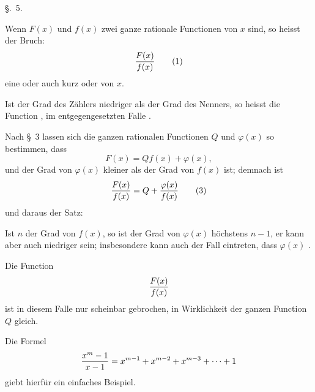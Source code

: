 
\begin{center}
{\large \S.\ 5.}

\vspace{0.5em}
{\large{}}
\end{center}

Wenn $F(x)$ und $f(x)$ zwei ganze rationale Functionen von $x$ sind,
so heisst der Bruch:
\begin{equation}
 {F(x)\over f(x)}
\tag{1}
\end{equation}
eine  oder auch kurz
 oder  von $x$.

Ist der Grad des Zählers niedriger als der Grad des Nenners, so heisst
die Function , im entgegengesetzten Falle
.

Nach \S~3 lassen sich die ganzen rationalen Functionen $Q$ und
$\varphi(x)$ so bestimmen, dass
\begin{equation}
 F(x)=Qf(x)+\varphi(x),
\tag{2}
\end{equation}
und der Grad von $\varphi(x)$ kleiner als der Grad von $f(x)$ ist;
demnach ist
\begin{equation}
 {F(x)\over f(x)}=Q+{\varphi(x)\over f(x)}
\tag{3}
\end{equation}
und daraus der Satz:


Ist $n$ der Grad von $f(x)$, so ist der Grad von $\varphi(x)$ höchstens
$n-1$, er kann aber auch niedriger sein; insbesondere kann auch der
Fall eintreten, dass $\varphi(x)$ .

 Die Function
\[
 {F(x)\over f(x)}
\]
ist in diesem Falle nur scheinbar gebrochen, in Wirklichkeit der ganzen
Function $Q$ gleich.

Die Formel
\[
 {x^m-1\over x-1}=x^{m-1}+x^{m-2}+x^{m-3}+\cdots+1
\]
giebt hierfür ein einfaches Beispiel.
